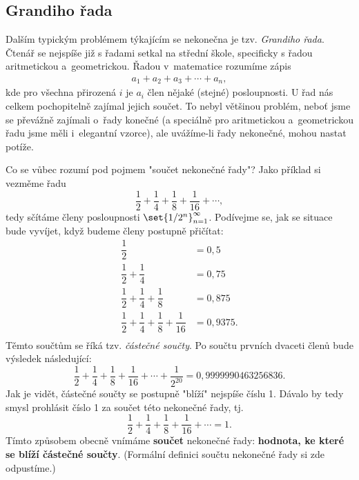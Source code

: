 \subsection{Grandiho řada}
Dalším typickým problémem týkajícím se nekonečna je tzv. \emph{Grandiho řada}. Čtenář se nejspíše již s řadami setkal na střední škole, specificky s řadou aritmetickou a~geometrickou. Řadou v~matematice rozumíme zápis
\begin{align*}
a_1+a_2+a_3+\cdots+a_n,
\end{align*}
kde pro všechna přirozená $i$ je $a_i$ člen nějaké (stejné) posloupnosti. U řad nás celkem pochopitelně zajímal jejich součet. To nebyl většinou problém, neboť jsme se převážně zajímali o~řady konečné (a speciálně pro aritmetickou a~geometrickou řadu jsme měli i~elegantní vzorce), ale uvážíme-li řady nekonečné, mohou nastat potíže.\par
Co se vůbec rozumí pod pojmem "součet nekonečné řady"? Jako příklad si vezměme řadu
\begin{equation*}
	\dfrac{1}{2}+\dfrac{1}{4}+\dfrac{1}{8}+\dfrac{1}{16}+\cdots,
\end{equation*}
tedy sčítáme členy posloupnosti $\set{1/2^n}_{n=1}^{\infty}$. Podívejme se, jak se situace bude vyvíjet, když budeme členy postupně přičítat:
\begin{align*}
	\dfrac{1}{2}&=0{,}5\\
	\dfrac{1}{2}+\dfrac{1}{4}&=0{,}75\\
	\dfrac{1}{2}+\dfrac{1}{4}+\dfrac{1}{8}&=0{,}875\\
	\dfrac{1}{2}+\dfrac{1}{4}+\dfrac{1}{8}+\dfrac{1}{16}&=0{,}9375.\\
\end{align*}
Těmto součtům se říká tzv. \emph{částečné součty}. Po součtu prvních dvaceti členů bude výsledek následující:
\begin{equation*}
	\dfrac{1}{2}+\dfrac{1}{4}+\dfrac{1}{8}+\dfrac{1}{16}+\cdots+\dfrac{1}{2^{20}}=0{,}9999990463256836.
\end{equation*}
Jak je vidět, částečné součty se postupně "blíží" nejspíše číslu 1. Dávalo by tedy smysl prohlásit číslo 1 za součet této nekonečné řady, tj.
\begin{equation*}
	\dfrac{1}{2}+\dfrac{1}{4}+\dfrac{1}{8}+\dfrac{1}{16}+\cdots=1.
\end{equation*}
Tímto způsobem obecně vnímáme \textbf{součet} nekonečné řady: \textbf{hodnota, ke které se blíží částečné součty}. (Formální definici součtu nekonečné řady si zde odpustíme.)
\medskip

